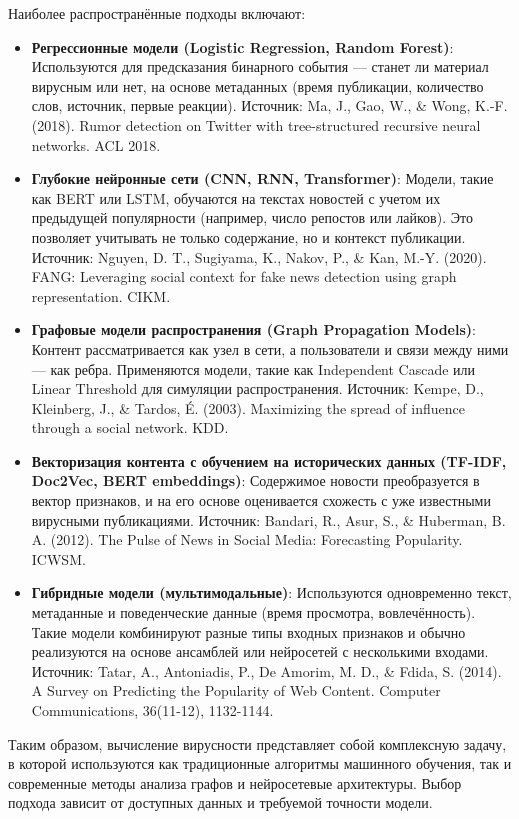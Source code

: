 Наиболее распространённые подходы включают:
\begin{itemize}
    \item \textbf{Регрессионные модели (Logistic Regression, Random Forest)}: Используются для предсказания бинарного события — станет ли материал вирусным или нет, на основе метаданных (время публикации, количество слов, источник, первые реакции). Источник: Ma, J., Gao, W., \& Wong, K.-F. (2018). Rumor detection on Twitter with tree-structured recursive neural networks. ACL 2018.
    \item \textbf{Глубокие нейронные сети (CNN, RNN, Transformer)}: Модели, такие как BERT или LSTM, обучаются на текстах новостей с учетом их предыдущей популярности (например, число репостов или лайков). Это позволяет учитывать не только содержание, но и контекст публикации. Источник: Nguyen, D. T., Sugiyama, K., Nakov, P., \& Kan, M.-Y. (2020). FANG: Leveraging social context for fake news detection using graph representation. CIKM.
    \item \textbf{Графовые модели распространения (Graph Propagation Models)}: Контент рассматривается как узел в сети, а пользователи и связи между ними — как ребра. Применяются модели, такие как Independent Cascade или Linear Threshold для симуляции распространения. Источник: Kempe, D., Kleinberg, J., \& Tardos, É. (2003). Maximizing the spread of influence through a social network. KDD.
    \item \textbf{Векторизация контента с обучением на исторических данных (TF-IDF, Doc2Vec, BERT embeddings)}: Содержимое новости преобразуется в вектор признаков, и на его основе оценивается схожесть с уже известными вирусными публикациями. Источник: Bandari, R., Asur, S., \& Huberman, B. A. (2012). The Pulse of News in Social Media: Forecasting Popularity. ICWSM.
    \item \textbf{Гибридные модели (мультимодальные)}: Используются одновременно текст, метаданные и поведенческие данные (время просмотра, вовлечённость). Такие модели комбинируют разные типы входных признаков и обычно реализуются на основе ансамблей или нейросетей с несколькими входами. Источник: Tatar, A., Antoniadis, P., De Amorim, M. D., \& Fdida, S. (2014). A Survey on Predicting the Popularity of Web Content. Computer Communications, 36(11-12), 1132-1144.
\end{itemize}

Таким образом, вычисление вирусности представляет собой комплексную задачу, в которой используются как традиционные алгоритмы машинного обучения, так и современные методы анализа графов и нейросетевые архитектуры. Выбор подхода зависит от доступных данных и требуемой точности модели.

